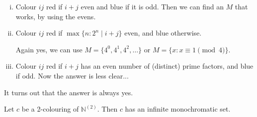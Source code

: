 \documentclass{article}
\newcommand{\red}[1]{\textcolor{bred}{#1}}
\newcommand{\blue}[1]{\textcolor{bblue}{#1}}
\begin{document}
\begin{eg}
  \leavevmode
  \begin{enumerate}[(i)]
    \item Colour $ij$ \red{red} if $i+j$ even and \blue{blue} if it is odd.
      Then we can find an $M$ that works, by using the evens.
    \item Colour $ij$ \red{red} if $\max\{n : 2^n \mid i+j\}$ even, and \blue{blue} otherwise.

      Again yes, we can use $M = \{4^0, 4^1, 4^2, \dotsc\}$ or $M = \{x : x \equiv 1 \pmod{4}\}$.
    \item Colour $ij$ \red{red} if $i+j$ has an even number of (distinct) prime factors, and \blue{blue} if odd.
      Now the answer is less clear...
  \end{enumerate}
\end{eg}
It turns out that the answer is always yes.
\begin{nthm}\label{thm:ramsey}
  Let $c$ be a 2-colouring of $\mathbb{N}^{(2)}$. Then $c$ has an infinite monochromatic set.
\end{nthm}
\end{document}
